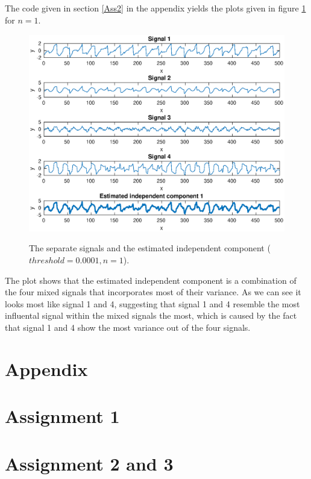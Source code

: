 \documentclass[10pt]{article}
\begin{document}
\subsection{}


\subsection{}
The code given in section \ref{Ass2} in the appendix yields the plots given in figure \ref{fig2.1} for $n = 1$.
\begin{figure}
  \centering
  \caption{The separate signals and the estimated independent component ($threshold = 0.0001, n = 1$).}
    \includegraphics[width=\columnwidth]{Ass2.eps}
  \label{fig2.1}
\end{figure}
The plot shows that the estimated independent component is a combination of the four mixed signals that incorporates most of their variance. As we can see it looks most like signal 1 and 4, suggesting that signal 1 and 4 resemble the most influental signal within the mixed signals the most, which is caused by the fact that signal 1 and 4 show the most variance out of the four signals.

\section{}

\newpage
\section*{Appendix}
\appendix
\section{Assignment 1}
{\label{Ass1}}
\section{Assignment 2 and 3}
{\label{Ass2}}
\end{document}
